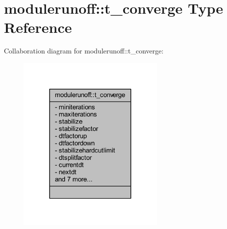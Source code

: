 \hypertarget{structmodulerunoff_1_1t__converge}{}\section{modulerunoff\+:\+:t\+\_\+converge Type Reference}
\label{structmodulerunoff_1_1t__converge}


Collaboration diagram for modulerunoff\+:\+:t\+\_\+converge\+:\nopagebreak
\begin{figure}[H]
\begin{center}
\leavevmode
\includegraphics[width=204pt]{structmodulerunoff_1_1t__converge__coll__graph}
\end{center}
\end{figure}
